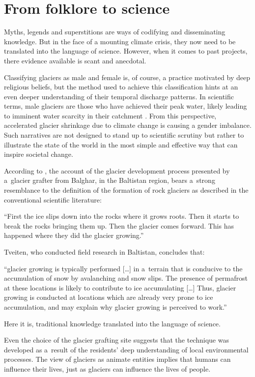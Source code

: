 \section{From folklore to science}

Myths, legends and superstitions are ways of codifying and disseminating knowledge. But in the face of a mounting climate crisis, they now need to be translated into the language of science.
However, when it comes to past projects, there evidence available is scant and anecdotal.

Classifying glaciers as male and female is, of course, a practice motivated by deep religious beliefs, but the method used to
achieve this classification hints at an even deeper understanding of their temporal discharge patterns. In
scientific terms, male glaciers are those who have achieved their peak water, likely leading to imminent
water scarcity in their catchment \citet{}. From this perspective, accelerated glacier shrinkage due to climate
change is causing a gender imbalance. Such narratives are not designed to stand up to scientific scrutiny but rather
to illustrate the state of the world in the most simple and effective way that can inspire societal change.

According to \citet{tveitenGlacierGrowingLocal2007}, the account of the glacier development process presented
by a glacier grafter from Balghar, in the Baltistan region, bears a strong resemblance to the definition of the formation of rock
glaciers as described in the conventional scientific literature: 

\begin{thesis_quotation}
“First the ice slips down into the rocks where it grows
roots. Then it starts to break the rocks bringing them up. Then the glacier comes forward. This has happened
where they did the glacier growing.” 
\end{thesis_quotation}

Tveiten, who conducted field research in Baltistan, concludes that: 

\begin{thesis_quotation}
“glacier growing is typically performed […] in a terrain that is conducive to the accumulation of snow by
avalanching and snow slips. The presence of permafrost at these locations is likely to contribute to ice
accumulating […] Thus, glacier growing is conducted at locations which are already very prone to ice
accumulation, and may explain why glacier growing is perceived to work.” 
\end{thesis_quotation}

Here it is, traditional knowledge translated into the language of science.

Even the choice of the glacier grafting site suggests that the technique was developed as a result of the residents' deep understanding of local environmental processes. The view of glaciers as animate entities implies that
humans can influence their lives, just as glaciers can influence the lives of people.

